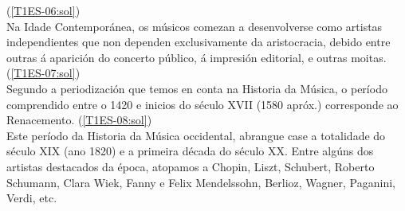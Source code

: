 %
    {%
    (\ref{T1ES-06:sol}) {\color{orange}{\hrulefill}}
    \\ \small{%
    Na Idade Contemporánea, os músicos comezan a desenvolverse como artistas independientes que non dependen exclusivamente da aristocracia, debido entre outras á aparición do concerto público, á impresión editorial, e outras moitas.
    {\color{orange}{\hrulefill}}
    }
    }
%
%
    {%
    (\ref{T1ES-07:sol}) {\color{orange}{\hrulefill}}
    \\ \small{%
    Segundo a periodización que temos en conta na Historia da Música, o período comprendido entre o 1420 e inicios do século XVII (1580 apróx.) corresponde ao Renacemento.
    {\color{orange}{\hrulefill}}
    }
    }
%
%
    {%
    (\ref{T1ES-08:sol}) {\color{orange}{\hrulefill}}
    \\ \small{%
    Este período da Historia da Música occidental, abrangue case a totalidade do século XIX (ano 1820) e a primeira década do século XX. Entre algúns dos artistas destacados da época, atopamos a Chopin, Liszt, Schubert, Roberto Schumann, Clara Wiek, Fanny e Felix Mendelssohn, Berlioz, Wagner, Paganini, Verdi, etc.
    {\color{orange}{\hrulefill}}
    }
    }
